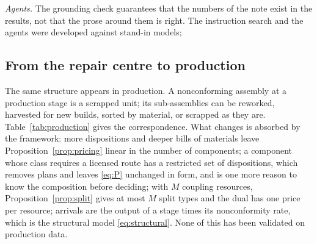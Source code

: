 \emph{Agents.} The grounding check guarantees that the numbers of the note exist in the results, not that the
prose around them is right. The instruction search and the agents were developed against stand-in models;

\subsection{From the repair centre to production}

The same structure appears in production. A nonconforming assembly at a production stage is a scrapped unit; its
sub-assemblies can be reworked, harvested for new builds, sorted by material, or scrapped as they are.
Table~\ref{tab:production} gives the correspondence. What changes is absorbed by the framework: more dispositions
and deeper bills of materials leave Proposition~\ref{prop:pricing} linear in the number of components; a
component whose class requires a licensed route has a restricted set of dispositions, which removes plans and
leaves \eqref{eq:P} unchanged in form, and is one more reason to know the composition before deciding; with $M$
coupling resources, Proposition~\ref{prop:split} gives at most $M$ split types and the dual has one price per
resource; arrivals are the output of a stage times its nonconformity rate, which is the structural model
\eqref{eq:structural}. None of this has been validated on production data.


